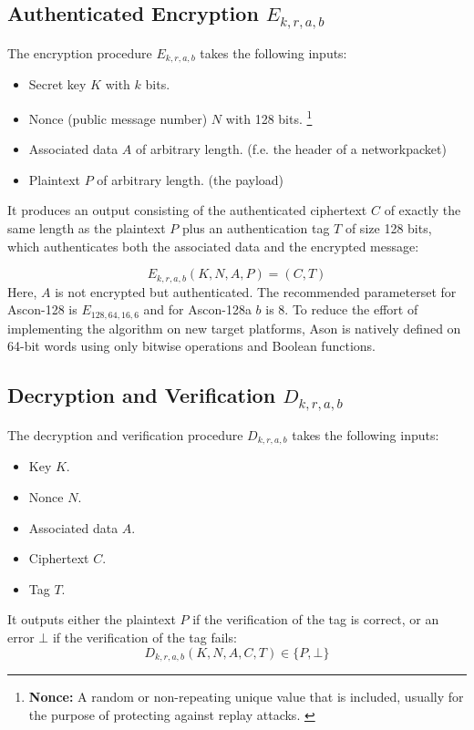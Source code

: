 \subsection{Authenticated Encryption $E_{k,r,a,b}$}
The encryption procedure $E_{k,r,a,b}$ takes the following inputs:
\begin{itemize}
    \item Secret key $K$ with $k$ bits.
    \item Nonce (public message number) $N$ with 128 bits. \footnote[2]{\textbf{Nonce:} A random or non-repeating unique value that is included, usually for the purpose of protecting against replay attacks. \cite[Page 200]{rfc4949}}
    \item Associated data $A$ of arbitrary length. (f.e. the header of a networkpacket)
    \item Plaintext $P$ of arbitrary length. (the payload)
\end{itemize}
It produces an output consisting of the authenticated ciphertext $C$ of exactly the same length as the plaintext $P$ plus an authentication tag $T$ of size 128 bits, which authenticates both the associated data and the encrypted message:

\[
E_{k,r,a,b}(K,N,A,P) = (C,T)
\]
Here, $A$ is not encrypted but authenticated. 
The recommended parameterset for Ascon-128 is $E_{128,64,16,6}$ and for Ascon-128a $b$ is 8. \cite[Chapter 2.2]{Ascon-v1.2} \newline
To reduce the effort of implementing the algorithm on new target platforms, Ason is natively defined on 64-bit words using only bitwise operations and Boolean functions. \cite[Chapter 4.1]{Ascon-v1.2}

\subsection{Decryption and Verification $D_{k,r,a,b}$}
The decryption and verification procedure $D_{k,r,a,b}$ takes the following inputs:
\begin{itemize}
    \item Key $K$.
    \item Nonce $N$.
    \item Associated data $A$.
    \item Ciphertext $C$.
    \item Tag $T$.
\end{itemize}
It outputs either the plaintext $P$ if the verification of the tag is correct, or an error $\bot$ if the verification of the tag fails:
\[
D_{k,r,a,b}(K,N,A,C,T) \in \{P, \bot\}
\]
\cite{Ascon-v1.2}

